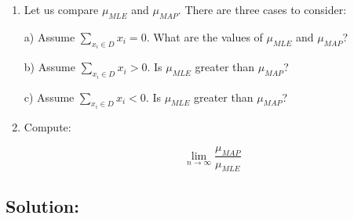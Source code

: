 \documentclass[submit]{harvardml}
\begin{document}
\begin{problem}
\begin{enumerate}
\item Let us compare $\mu_{MLE}$  and $\mu_{MAP}$. There are three cases to consider:

 a) Assume $\sum_{x_i \in D} x_i=0$. What are the values of $\mu_{MLE}$ and $\mu_{MAP}$?

 b) Assume $\sum_{x_i \in D} x_i>0$. Is $\mu_{MLE}$ greater than $\mu_{MAP}$?

 c) Assume $\sum_{x_i \in D} x_i<0$. Is $\mu_{MLE}$ greater than $\mu_{MAP}$?
  
    
\item Compute:

$$\lim_{n \rightarrow \infty} \frac{\mu_{MAP}}{\mu_{MLE}}$$

  \end{enumerate}

  \end{problem}

\subsection*{Solution:}
\end{document}

